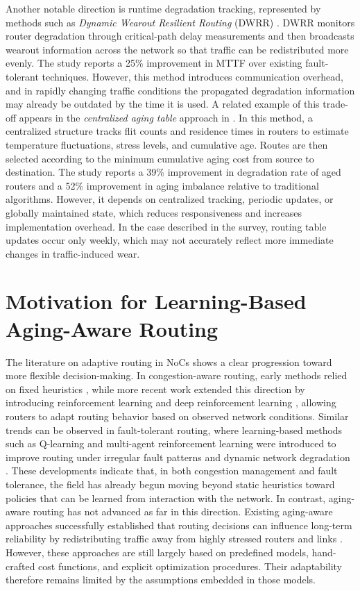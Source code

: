 Another notable direction is runtime degradation tracking, represented by methods such as \textit{Dynamic Wearout Resilient Routing} (DWRR) \cite{Ancajas2014}. DWRR monitors router degradation through critical-path delay measurements and then broadcasts wearout information across the network so that traffic can be redistributed more evenly. The study reports a 25\% improvement in MTTF over existing fault-tolerant techniques. However, this method introduces communication overhead, and in rapidly changing traffic conditions the propagated degradation information may already be outdated by the time it is used. A related example of this trade-off appears in the \textit{centralized aging table} approach in \cite{Ghaderi2017}. In this method, a centralized structure tracks flit counts and residence times in routers to estimate temperature fluctuations, stress levels, and cumulative age. Routes are then selected according to the minimum cumulative aging cost from source to destination. The study reports a 39\% improvement in degradation rate of aged routers and a 52\% improvement in aging imbalance relative to traditional algorithms. However, it depends on centralized tracking, periodic updates, or globally maintained state, which reduces responsiveness and increases implementation overhead. In the case described in the survey, routing table updates occur only weekly, which may not accurately reflect more immediate changes in traffic-induced wear.

\section{Motivation for Learning-Based Aging-Aware Routing}

The literature on adaptive routing in NoCs shows a clear progression toward more flexible decision-making. In congestion-aware routing, early methods relied on fixed heuristics \cite{Hu2004} \cite{Gratz2008}, while more recent work extended this direction by introducing reinforcement learning and deep reinforcement learning \cite{DBLP:journals/corr/abs-1908-04484} \cite{Reza2021}, allowing routers to adapt routing behavior based on observed network conditions. Similar trends can be observed in fault-tolerant routing, where learning-based methods such as Q-learning and multi-agent reinforcement learning were introduced to improve routing under irregular fault patterns and dynamic network degradation \cite{Samala2020} \cite{Samala2022}. These developments indicate that, in both congestion management and fault tolerance, the field has already begun moving beyond static heuristics toward policies that can be learned from interaction with the network. In contrast, aging-aware routing has not advanced as far in this direction. Existing aging-aware approaches successfully established that routing decisions can influence long-term reliability by redistributing traffic away from highly stressed routers and links \cite{Clotho2015} \cite{Wang2016}. However, these approaches are still largely based on predefined models, hand-crafted cost functions, and explicit optimization procedures. Their adaptability therefore remains limited by the assumptions embedded in those models.

